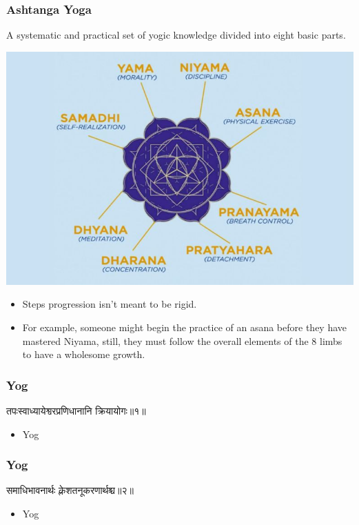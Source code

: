 \begin{frame}[fragile]\frametitle{Ashtanga  Yoga}

A systematic and practical set of yogic knowledge divided into eight basic parts.

\begin{center}
\includegraphics[width=0.6\linewidth,keepaspectratio]{images/yog22}
\end{center}

		\begin{itemize}
		\item Steps progression isn’t meant to be rigid. 
		\item For example, someone might begin the practice of an asana before they have mastered Niyama, still, they must follow the overall elements of the 8 limbs to have a wholesome growth.
		\end{itemize}
		
\end{frame}


\begin{frame}[fragile]\frametitle{Yog}
\begin{sanskrit}
तपःस्वाध्यायेश्वरप्रणिधानानि क्रियायोगः॥१॥
\end{sanskrit}
	\begin{itemize}
	\item Yog 
	\end{itemize}
\end{frame}

\begin{frame}[fragile]\frametitle{Yog}
\begin{sanskrit}
समाधिभावनार्थः क्लेशतनूकरणार्थश्च॥२॥
\end{sanskrit}
	\begin{itemize}
	\item Yog 
	\end{itemize}
\end{frame}




